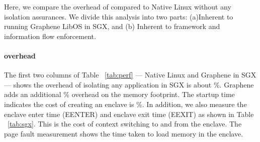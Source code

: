 %
%

Here, we compare the overhead of \sysname{} compared to Native Linux without any 
isolation assurances. We divide this analysis into two parts: (a)Inherent to running Graphene LibOS in SGX, and (b) Inherent to \sysname{} framework and information flow enforcement.

\paragraph{\sgx{} overhead}
The first two columns of Table ~\ref{tab:perf} --- Native Linux and Graphene in SGX --- shows the overhead of isolating any application in SGX is about \%. Graphene adds an additional \% overhead on the memory footprint. The startup time indicates the cost of creating an enclave is \%. 
In addition, we also measure the \sgx{} enclave enter time (EENTER) and enclave exit time (EEXIT) as shown in Table ~\ref{tab:sgx}. This is the cost of context switching to and from the enclave. The page fault measurement shows the time taken to load memory in the enclave.

